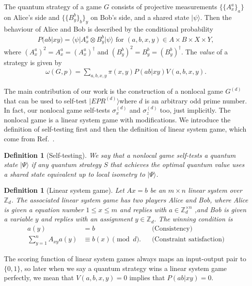 \documentclass[11pt,letterpaper]{article}
\newcommand{\ket}[1]{|#1\rangle}
\newcommand{\bra}[1]{\langle#1|}
\newcommand{\x}{\otimes}
\newcommand{\Z}{\mathbb{Z}}
\newcommand{\1}{\mathbb{1}}
\newcommand{\EPR}[1]{EPR^{(#1)}}
\newcommand{\paulix}[1]{\sigma_x^{(#1)}}
\newcommand{\pauliz}[1]{\sigma_z^{(#1)}}
\newcommand{\G}[1]{G^{(#1)}}
\newcommand{\pr}[2]{P(#1|#2)}
\newtheorem{definition}[theorem]{Definition}
\theoremstyle{definition}
\begin{document}
The quantum strategy of a game $G$ consists of projective measurements $\{\{A_x^a\}_a\}$ on Alice's side and 
$\{\{B_y^b\}_b\}_y$ on Bob's side, and a shared state $\ket{\psi}$. Then the behaviour of Alice and Bob is described 
by the conditional probability
\begin{align}
	\pr{ab}{xy} = \bra{\psi} A_x^a \x B_y^b \ket{\psi} \text{ for } (a,b,x,y) \in A \times B \times X \times Y,
\end{align}
where $(A_x^a)^2 = A_x^a = (A_x^a)^\dagger$ and $(B_y^b)^2 = B_y^b = (B_y^b)^\dagger$.
The \emph{value} of a strategy is given by
\begin{align}
	\omega(G,p)  = \sum_{a,b,x,y} \pi(x,y) \pr{ab}{xy} V(a,b,x,y).
\end{align} 

The main contribution of our work is the construction of a nonlocal game $\G{d}$ that can be used to self-test $\ket{\EPR{d}}$where $d$ is an arbitrary odd prime number. 
In fact, our nonlocal game self-tests $\paulix{d}$ and $\pauliz{d}$ too, just implicitly.
The nonlocal game is a linear system game with modifications. 
We introduce the definition of self-testing first and then the definition of linear system game, 
which come from Ref.~\cite{coladan2017, slofstra2017}.
\begin{definition}[Self-testing]
	We say that a nonlocal game self-tests a quantum state $\ket{\Psi}$ if 
	any quantum strategy $S$ that achieves the optimal quantum value uses a shared state equivalent up to local isometry to $\ket{\Psi}$.
\end{definition}
\begin{definition}[Linear system game]
 Let $Ax = b$ be an $m \times n$ linear system over $\Z_d$. The associated linear system game has two
 players Alice and Bob, where Alice is given a equation number $1 \leq x \leq m$ and replies with $a \in \Z_d^{\times n}$
 ,and Bob is given a variable $y$ and replies with an assignment $y \in \Z_d$. The winning condition is 
 \begin{align*}
 	a(y) &= b && \text{(Consistency)} \\
	\sum_{y = 1}^n A_{xy} a(y) &\equiv b(x) \pmod d. &&\text{(Constraint satisfaction)}
 \end{align*}
\end{definition}
The scoring function of linear system games always maps an input-output pair to $\{0,1\}$, 
so later when we say a quantum strategy wins a linear system game perfectly, we mean that 
$V(a,b,x,y) =0$ implies that $\pr{ab}{xy} = 0$.
\end{document}
